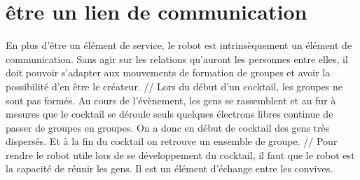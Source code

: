 
\section{être un lien de communication}

En plus d’être un élément de service, le robot est intrinsèquement un élément de communication. Sans agir sur les relations qu’auront les personnes entre elles, il doit pouvoir s’adapter aux mouvements de formation de groupes et avoir la possibilité d’en être le créateur.
//
Lors du début d’un cocktail, les groupes ne sont pas formés. Au cours de l’évènement, les gens se rassemblent et au fur à mesures que le cocktail se déroule seuls quelques électrons libres continue de passer de groupes en groupes. On a donc en début de cocktail des gens très dispersés. Et à la fin du cocktail on retrouve un ensemble de groupe.
//
Pour rendre le robot utile lors de se développement du cocktail, il faut que le robot   est la capacité de réunir les gens. Il est un élément d’échange entre les convives.



